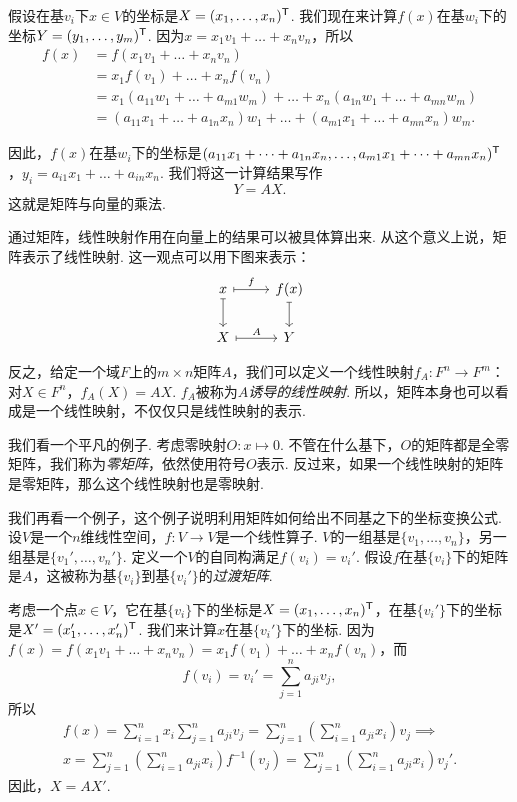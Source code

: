 假设在基$v_i$下$x\in V$的坐标是$X=(x_1,\dots,x_n)^{\mathsf{T}}$. 我们现在来计算$f(x)$在基$w_i$下的坐标$Y=(y_1,\dots,y_m)^{\mathsf{T}}$. 因为$x=x_1v_1+\dots+x_nv_n$，所以
\begin{align*}
    f(x)&=f(x_1v_1+\dots+x_nv_n)\\
    &=x_1f(v_1)+\dots+x_nf(v_n)\\
    &=x_1(a_{11}w_1+\dots+a_{m1}w_m)+\dots+x_n(a_{1n}w_1+\dots+a_{mn}w_m)\\
    &=(a_{11}x_1+\dots+a_{1n}x_n)w_1+\dots+(a_{m1}x_1+\dots+a_{mn}x_n)w_m.
\end{align*}

因此，$f(x)$在基$w_i$下的坐标是$(a_{11}x_1+\dots+a_{1n}x_n,\dots,a_{m1}x_1+\dots+a_{mn}x_n)^{\mathsf{T}}$，$y_i=a_{i1}x_1+\dots+a_{in}x_n$. 我们将这一计算结果写作
\[Y=AX.\]
这就是矩阵与向量的乘法. 

通过矩阵，线性映射作用在向量上的结果可以被具体算出来. 从这个意义上说，矩阵表示了线性映射. 这一观点可以用下图来表示：
\[\begin{tikzcd}
    x\arrow[r,mapsto,"f"]\arrow[d,mapsto]&f(x)\arrow[d,mapsto]\\
    X\arrow[r,mapsto,"A"]&Y
    \end{tikzcd}\] 

反之，给定一个域$F$上的$m\times n$矩阵$A$，我们可以定义一个线性映射$f_A:F^n\to F^m$：对$X\in F^n$，$f_A(X)=AX$. $f_A$被称为$A$\textit{诱导的线性映射}. 所以，矩阵本身也可以看成是一个线性映射，不仅仅只是线性映射的表示. 

我们看一个平凡的例子. 考虑零映射$O:x\mapsto 0$. 不管在什么基下，$O$的矩阵都是全零矩阵，我们称为\textit{零矩阵}，依然使用符号$O$表示. 反过来，如果一个线性映射的矩阵是零矩阵，那么这个线性映射也是零映射. 

我们再看一个例子，这个例子说明利用矩阵如何给出不同基之下的坐标变换公式. 设$V$是一个$n$维线性空间，$f:V\to V$是一个线性算子. $V$的一组基是$\{v_1,\dots,v_n\}$，另一组基是$\{v_1',\dots,v_n'\}$. 定义一个$V$的自同构满足$f(v_i)=v_i'$. 假设$f$在基$\{v_i\}$下的矩阵是$A$，这被称为基$\{v_i\}$到基$\{v_i'\}$的\textit{过渡矩阵}.

考虑一个点$x\in V$，它在基$\{v_i\}$下的坐标是$X=(x_1,\dots,x_n)^{\mathsf{T}}$，在基$\{v_i'\}$下的坐标是$X'=(x_1',\dots,x_n')^{\mathsf{T}}$. 我们来计算$x$在基$\{v_i'\}$下的坐标. 因为$f(x)=f(x_1v_1+\dots+x_nv_n)=x_1f(v_1)+\dots+x_nf(v_n)$，而
\[f(v_i)=v_i'=\sum_{j=1}^n a_{ji}v_j,\]
所以
\begin{gather*}
f(x)=\sum_{i=1}^n x_i\sum_{j=1}^n a_{ji}v_j=\sum_{j=1}^n\left(\sum_{i=1}^n a_{ji}x_i\right)v_j\implies\\
 x=\sum_{j=1}^n\left(\sum_{i=1}^n a_{ji}x_i\right)f^{-1}(v_j)=\sum_{j=1}^n\left(\sum_{i=1}^n a_{ji}x_i\right)v_j'.
\end{gather*}
因此，$X=AX'$.


